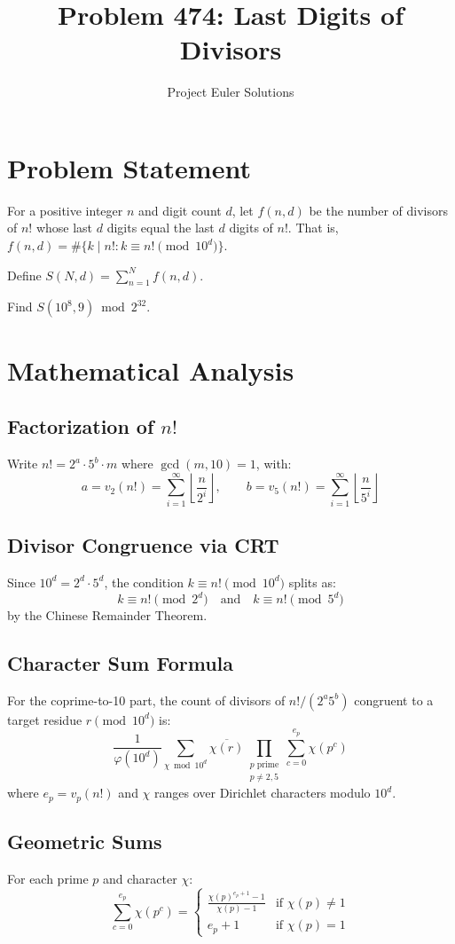 \documentclass[11pt]{article}
\title{Problem 474: Last Digits of Divisors}
\author{Project Euler Solutions}
\date{}
\begin{document}
\maketitle

\section{Problem Statement}
For a positive integer $n$ and digit count $d$, let $f(n, d)$ be the number of divisors of $n!$ whose last $d$ digits equal the last $d$ digits of $n!$. That is, $f(n,d) = \#\{k \mid n! : k \equiv n! \pmod{10^d}\}$.

Define $S(N, d) = \sum_{n=1}^{N} f(n, d)$.

Find $S(10^8, 9) \bmod 2^{32}$.

\section{Mathematical Analysis}

\subsection{Factorization of $n!$}
Write $n! = 2^a \cdot 5^b \cdot m$ where $\gcd(m, 10) = 1$, with:
\[
a = v_2(n!) = \sum_{i=1}^{\infty} \left\lfloor \frac{n}{2^i} \right\rfloor, \qquad
b = v_5(n!) = \sum_{i=1}^{\infty} \left\lfloor \frac{n}{5^i} \right\rfloor
\]

\subsection{Divisor Congruence via CRT}
Since $10^d = 2^d \cdot 5^d$, the condition $k \equiv n! \pmod{10^d}$ splits as:
\[
k \equiv n! \pmod{2^d} \quad \text{and} \quad k \equiv n! \pmod{5^d}
\]
by the Chinese Remainder Theorem.

\subsection{Character Sum Formula}
For the coprime-to-10 part, the count of divisors of $n!/(2^a 5^b)$ congruent to a target residue $r \pmod{10^d}$ is:
\[
\frac{1}{\varphi(10^d)} \sum_{\chi \bmod{10^d}} \overline{\chi(r)} \prod_{\substack{p \text{ prime} \\ p \ne 2,5}} \sum_{c=0}^{e_p} \chi(p^c)
\]
where $e_p = v_p(n!)$ and $\chi$ ranges over Dirichlet characters modulo $10^d$.

\subsection{Geometric Sums}
For each prime $p$ and character $\chi$:
\[
\sum_{c=0}^{e_p} \chi(p^c) = \begin{cases}
\frac{\chi(p)^{e_p+1} - 1}{\chi(p) - 1} & \text{if } \chi(p) \ne 1 \\
e_p + 1 & \text{if } \chi(p) = 1
\end{cases}
\]
\end{document}
